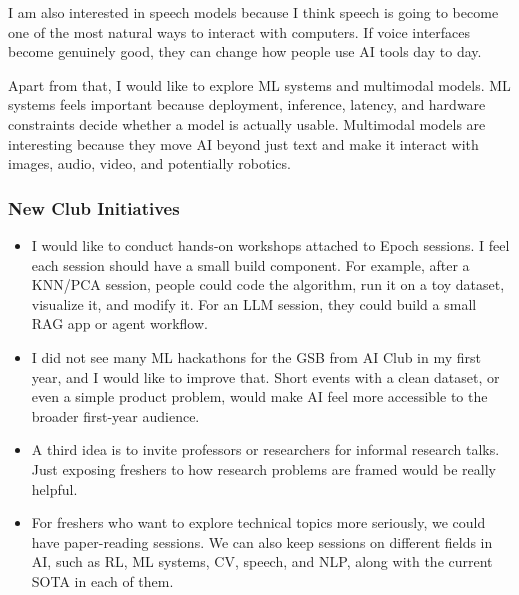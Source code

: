 \documentclass[11pt,a4paper]{article}
\begin{document}
I am also interested in speech models because I think speech is going to become one of the most natural ways to interact with computers. If voice interfaces become genuinely good, they can change how people use AI tools day to day.

Apart from that, I would like to explore ML systems and multimodal models. ML systems feels important because deployment, inference, latency, and hardware constraints decide whether a model is actually usable. Multimodal models are interesting because they move AI beyond just text and make it interact with images, audio, video, and potentially robotics.

\subsubsection{New Club Initiatives}
\begin{itemize}
    \item I would like to conduct hands-on workshops attached to Epoch sessions. I feel each session should have a small build component. For example, after a KNN/PCA session, people could code the algorithm, run it on a toy dataset, visualize it, and modify it. For an LLM session, they could build a small RAG app or agent workflow.

    \item I did not see many ML hackathons for the GSB from AI Club in my first year, and I would like to improve that. Short events with a clean dataset, or even a simple product problem, would make AI feel more accessible to the broader first-year audience.

    \item A third idea is to invite professors or researchers for informal research talks. Just exposing freshers to how research problems are framed would be really helpful.

    \item For freshers who want to explore technical topics more seriously, we could have paper-reading sessions. We can also keep sessions on different fields in AI, such as RL, ML systems, CV, speech, and NLP, along with the current SOTA in each of them.
\end{itemize}
\end{document}
